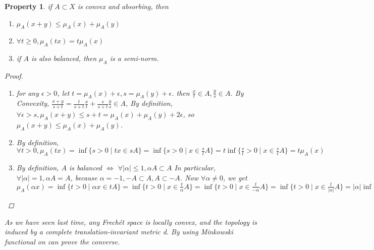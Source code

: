 \documentclass{article}
\newtheorem*{property}{Property}
\begin{document}
\begin{property} if $A \subset X$ is convex and absorbing, then
    \begin{enumerate}
        \item $\mu_A(x + y) \le \mu_A(x) + \mu_A(y)$
        \item $\forall t \ge 0, \mu_A(tx) = t\mu_A(x)$
        \item if $A$ is also balanced, then $\mu_A$ is a semi-norm.
    \end{enumerate}
    \begin{proof} \hfill
       \begin{enumerate}
        \item for any $\epsilon > 0$, let $t=\mu_A(x) + \epsilon, s=\mu_A(y) + \epsilon$.
        then $\frac{x}{t} \in A, \frac{y}{s} \in A$. 
        By Convexity, $\frac{x+y}{s+t} = \frac{t}{s+t}\frac{x}{t} + \frac{s}{s+t}\frac{y}{s} \in A$,
        By definition, $\forall \epsilon > s, \mu_A(x+y) \le s + t = \mu_A(x) + \mu_A(y) + 2\epsilon$,
        so $\mu_A(x+y) \le \mu_A(x) + \mu_A(y)$. 
        \item By definition, 
        $
            \forall t>0, \mu_A(tx) = \inf\{s>0 \mid tx \in sA\} 
                                   = \inf\{s>0 \mid x \in \frac{s}{t}A\}
                                   = t\inf\{\frac{s}{t}>0 \mid x \in \frac{s}{t}A\}
                                   = t\mu_A(x)
        $
        \item By definition, $A$ is balanced $\Leftrightarrow$ $\forall |\alpha| \le 1, \alpha A \subset A$
        In particular, $\forall |\alpha|=1, \alpha A = A$, because $\alpha = -1, -A \subset A, A \subset -A$.
        Now $\forall \alpha \neq 0$, we get
        $
            \mu_A(\alpha x) = \inf\{t > 0 \mid \alpha x \in tA\}
                            = \inf\{t > 0 \mid x \in \frac{t}{\alpha}A\}
                            = \inf\{t > 0 \mid x \in \frac{t}{-\alpha}A\}
                            = \inf\{t > 0 \mid x \in \frac{t}{|\alpha|}A\}
                            = |\alpha|\inf\{\frac{t}{|\alpha|} > 0 \mid x \in \frac{t}{|\alpha|}A\}
                            = |\alpha|\mu_A(x)
        $
       \end{enumerate} 
    \end{proof}
    As we have seen last time, 
    any Frech\'et space is locally convex, and the topology is induced by a complete translation-invariant metric d. 
    By using Minkowski functional on can prove the converse.
    
\end{property}
\end{document}
